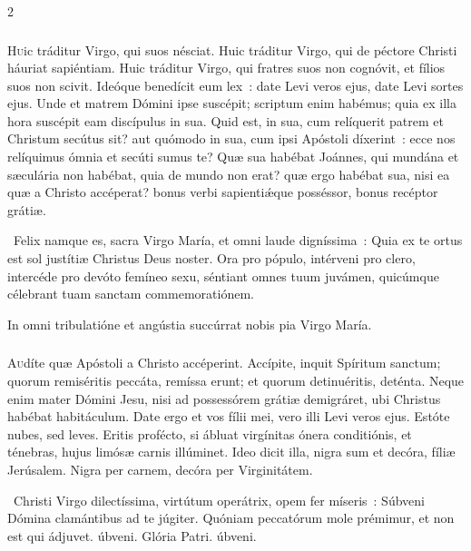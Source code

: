 \documentclass[9pt,twoside]{extarticle}
\begin{document}
\begin{multicols}{2}
{{\subsubsection*{\center {}}
\lettrine{H}uic tráditur Virgo, qui suos nésciat. Huic tráditur Virgo, qui de péctore Christi háuriat sapiéntiam. Huic tráditur Virgo, qui fratres suos non cognóvit, et fílios suos non scivit. Ideóque benedícit eum lex~: date Levi veros ejus, date Levi sortes ejus. Unde et matrem Dómini ipse suscépit; scriptum enim habémus; quia ex illa hora suscépit eam discípulus in sua. Quid est, in sua, cum relíquerit patrem et Christum secútus sit? aut quómodo in sua, cum ipsi Apóstoli díxerint~: ecce nos relíquimus ómnia et secúti sumus te? Quæ sua habébat Joánnes, qui mundána et sæculária non habébat, quia de mundo non erat? quæ ergo habébat sua, nisi ea quæ a Christo accéperat? bonus verbi sapientiǽque posséssor, bonus recéptor grátiæ.

\begin{tightlist}{}
\item {}~Felix namque es, sacra Virgo María, et omni laude digníssima~: \textred{*} Quia ex te ortus est sol justítiæ Christus Deus noster.
 Ora pro pópulo, intérveni pro clero, intercéde pro devóto femíneo sexu, séntiant omnes tuum juvámen, quicúmque célebrant tuam sanctam commemoratiónem.
\item {\small {} In omni tribulatióne et angústia succúrrat nobis pia Virgo María.}
\end{tightlist}

\subsubsection*{\center {}}
\lettrine{A}udíte quæ Apóstoli a Christo accéperint. Accípite, inquit Spíritum sanctum; quorum remiséritis peccáta, remíssa erunt; et quorum detinuéritis, deténta. Neque enim mater Dómini Jesu, nisi ad possessórem grátiæ demigráret, ubi Christus habébat habitáculum. Date ergo et vos fílii mei, vero illi Levi veros ejus. Estóte nubes, sed leves. Eritis profécto, si ábluat virgínitas ónera conditiónis, et ténebras, hujus limósæ carnis illúminet. Ideo dicit illa, nigra sum et decóra, fíliæ Jerúsalem. Nigra per carnem, decóra per Virginitátem.

\begin{tightlist}{}
\item {}~Christi Virgo dilectíssima, virtútum operátrix, opem fer míseris~: \textred{*} Súbveni Dómina clamántibus ad te júgiter.
 Quóniam peccatórum mole prémimur, et non est qui ádjuvet. úbveni. Glória Patri. úbveni.
\end{tightlist}

}}
\end{multicols}
\end{document}
